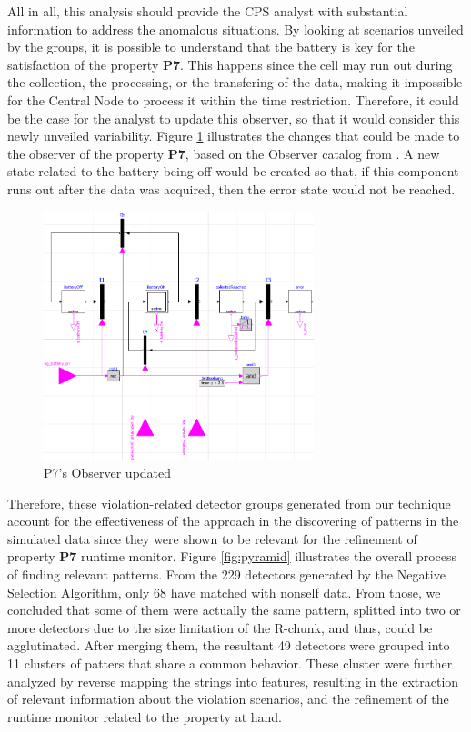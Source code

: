 All in all, this analysis should provide the CPS analyst with substantial information to address the anomalous situations. By looking at scenarios unveiled by the groups, it is possible to understand that the battery is key for the satisfaction of the property \textbf{P7}. This happens since the cell may run out during the collection, the processing, or the transfering of the data, making it impossible for the Central Node to process it within the time restriction. Therefore, it could be the case for the analyst to update this observer, so that it would consider this newly unveiled variability. Figure \ref{fig:ev_observer_fxd} illustrates the changes that could be made to the observer of the property \textbf{P7}, based on the Observer catalog from \cite{2022PSP}. A new state related to the battery being off would be created so that, if this component runs out after the data was acquired, then the error state would not be reached.

\begin{figure}[]
	\centering
	\includegraphics[width=0.7\textwidth, keepaspectratio]{img/observer_fxd.png}
	\caption{P7's Observer updated}
	\label{fig:ev_observer_fxd}
\end{figure}

Therefore, these violation-related detector groups generated from our technique account for the effectiveness of the approach in the discovering of patterns in the simulated data since they were shown to be relevant for the refinement of property \textbf{P7} runtime monitor. Figure \ref{fig:pyramid} illustrates the overall process of finding relevant patterns. From the 229 detectors generated by the Negative Selection Algorithm, only 68 have matched with nonself data. From those, we concluded that some of them were actually the same pattern, splitted into two or more detectors due to the size limitation of the R-chunk, and thus, could be agglutinated. After merging them, the resultant 49 detectors were grouped into 11 clusters of patters that share a common behavior. These cluster were further analyzed by reverse mapping the strings into features, resulting in the extraction of relevant information about the violation scenarios, and the refinement of the runtime monitor related to the property at hand.



